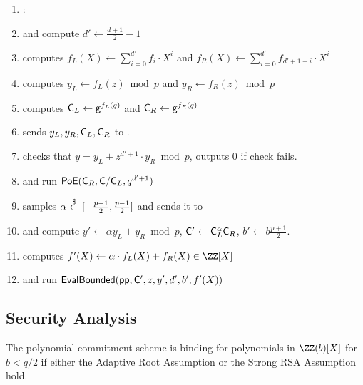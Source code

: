 \begin{mdframed}
\begin{minipage}{\textwidth}
\begin{enumerate}[nolistsep]
        \item \pcelse: 
       
        \item \pcind[1] \prover and \verifier compute $d' \gets \frac{d+1}{2} - 1$
        \item \pcind[1] \prover computes $f_L(X) \gets \sum\limits_{i=0}^{d'} f_i \cdot X^i$ and $f_R(X)\gets\sum\limits_{i=0}^{d'} f_{d'+1+i}\cdot X^{i}$
        \item \pcind[1] \prover computes $y_L\gets f_L(z) \bmod p$ and $y_R\gets f_R(z)\bmod p$
        \item \pcind[1] \prover computes $\mathsf{C}_L \gets \mathsf{g}^{f_L(q)}$ and $\mathsf{C}_R \gets \mathsf{g}^{f_R(q)}$
        \item \pcind[1] \prover sends $y_L,y_R, \mathsf{C}_L, \mathsf{C}_R$ to \verifier. 
        \item \pcind[1] \verifier checks that $y=y_L+z^{d'+1}\cdot y_R \bmod p$, outputs $0$ if check fails.
        \item \pcind[1] \label{line:PoE} \prover and \verifier run $\textsf{{PoE}}(\mathsf{C}_R, \mathsf{C}/\mathsf{C}_L, q^{d'+1})$
        \item \pcind[1] \verifier samples $\alpha \overset{\$}{\gets} [-\frac{p-1}{2},\frac{p-1}{2}]$ and sends it to \prover
        \item \pcind[1] \prover and \verifier compute $y'\gets\alpha  y_L +y_R \bmod p$, $\mathsf{C}' \gets \mathsf{C}_L^\alpha  \mathsf{C}_R$, $b'\gets b \frac{p+1}{2}$. 
        \item \pcind[1] \prover computes $f'(X) \gets \alpha \cdot f_L(X) + f_R(X) \in \ZZ[X]$ 
        \item \pcind[1] \prover and \verifier run $\textsf{{EvalBounded}}(\textsf{pp}, \mathsf{C}', z, y', d',b' ; f'(X))$
               \end{enumerate}
      \end{minipage}
\end{mdframed}


\begin{comment}
\end{comment}

\subsection{Security Analysis} 
 \newcommand{\bindinglemma}{
 The polynomial commitment scheme is binding for polynomials in $\ZZ(b)[X]$ for $b<q/2$ if either the Adaptive Root Assumption or the Strong RSA Assumption hold.
	}
\begin{lemma}
\label{lem:binding}
	\bindinglemma
	\end{lemma}

